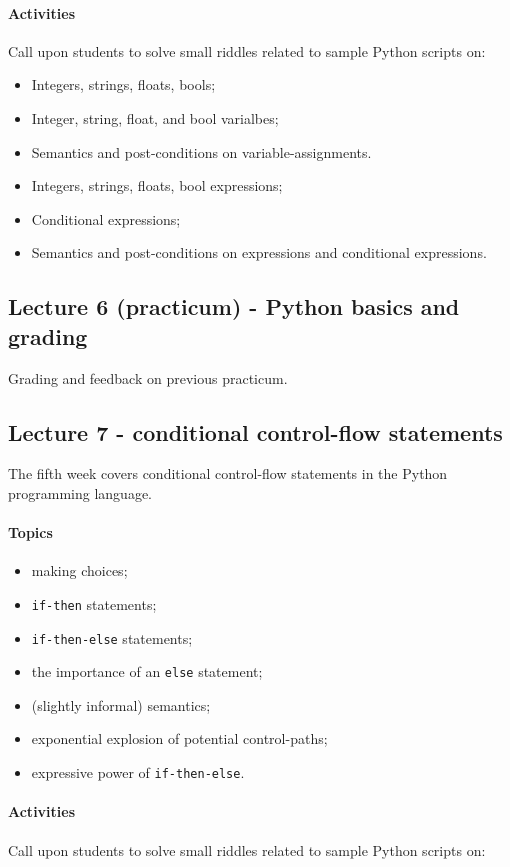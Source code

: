 \documentclass[12pt,a4paper,final]{article}
\begin{document}
\paragraph*{Activities}
Call upon students to solve small riddles related to sample Python scripts on:

\begin{itemize}
\item Integers, strings, floats, bools;
\item Integer, string, float, and bool varialbes;
\item Semantics and post-conditions on variable-assignments.
\item Integers, strings, floats, bool expressions;
\item Conditional expressions;
\item Semantics and post-conditions on expressions and conditional expressions.
\end{itemize}


\subsection{Lecture 6 (practicum) - Python basics and grading}
Grading and feedback on previous practicum.


\subsection{Lecture 7 - conditional control-flow statements}
The fifth week covers conditional control-flow statements in the Python programming language.

\paragraph*{Topics}
\begin{itemize}
\item making choices;
\item \texttt{if-then} statements;
\item \texttt{if-then-else} statements;
\item the importance of an \texttt{else} statement;
\item (slightly informal) semantics;
\item exponential explosion of potential control-paths;
\item expressive power of \texttt{if-then-else}.
\end{itemize}

\paragraph*{Activities}
Call upon students to solve small riddles related to sample Python scripts on:
\end{document}
